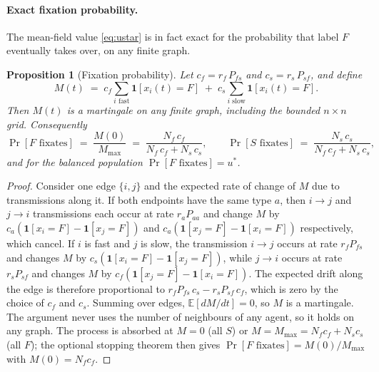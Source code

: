 \documentclass{article}
\newcommand{\Pab}[2]{P_{#1#2}}      %
\newtheorem{proposition}{Proposition}
\begin{document}
\paragraph{Exact fixation probability.} The mean-field value \eqref{eq:ustar} is in fact exact for the probability that label $F$ eventually takes over, on any finite graph.

\begin{proposition}[Fixation probability]
\label{prop:fixation}
Let $c_f = r_f\, \Pab{f}{s}$ and $c_s = r_s\, \Pab{s}{f}$, and define
\[
M(t) \;=\; c_f \sum_{i \text{ fast}} \mathbf{1}[x_i(t) = F] \;+\; c_s \sum_{i \text{ slow}} \mathbf{1}[x_i(t) = F].
\]
Then $M(t)$ is a martingale on any finite graph, including the bounded $n \times n$ grid. Consequently
\begin{equation}
\Pr[F \text{ fixates}] \;=\; \frac{M(0)}{M_{\max}} \;=\; \frac{N_f\, c_f}{N_f\, c_f + N_s\, c_s}, \qquad
\Pr[S \text{ fixates}] \;=\; \frac{N_s\, c_s}{N_f\, c_f + N_s\, c_s},
\label{eq:fixation}
\end{equation}
and for the balanced population $\Pr[F \text{ fixates}] = u^\ast$.
\end{proposition}

\begin{proof}
Consider one edge $\{i, j\}$ and the expected rate of change of $M$ due to transmissions along it. If both endpoints have the same type $a$, then $i \to j$ and $j \to i$ transmissions each occur at rate $r_a \Pab{a}{a}$ and change $M$ by $c_a(\mathbf{1}[x_i = F] - \mathbf{1}[x_j = F])$ and $c_a(\mathbf{1}[x_j = F] - \mathbf{1}[x_i = F])$ respectively, which cancel. If $i$ is fast and $j$ is slow, the transmission $i \to j$ occurs at rate $r_f \Pab{f}{s}$ and changes $M$ by $c_s(\mathbf{1}[x_i = F] - \mathbf{1}[x_j = F])$, while $j \to i$ occurs at rate $r_s \Pab{s}{f}$ and changes $M$ by $c_f(\mathbf{1}[x_j = F] - \mathbf{1}[x_i = F])$. The expected drift along the edge is therefore proportional to $r_f \Pab{f}{s}\, c_s - r_s \Pab{s}{f}\, c_f$, which is zero by the choice of $c_f$ and $c_s$. Summing over edges, $\mathbb{E}[dM/dt] = 0$, so $M$ is a martingale. The argument never uses the number of neighbours of any agent, so it holds on any graph. The process is absorbed at $M = 0$ (all $S$) or $M = M_{\max} = N_f c_f + N_s c_s$ (all $F$); the optional stopping theorem then gives $\Pr[F \text{ fixates}] = M(0)/M_{\max}$ with $M(0) = N_f c_f$.
\end{proof}
\end{document}
